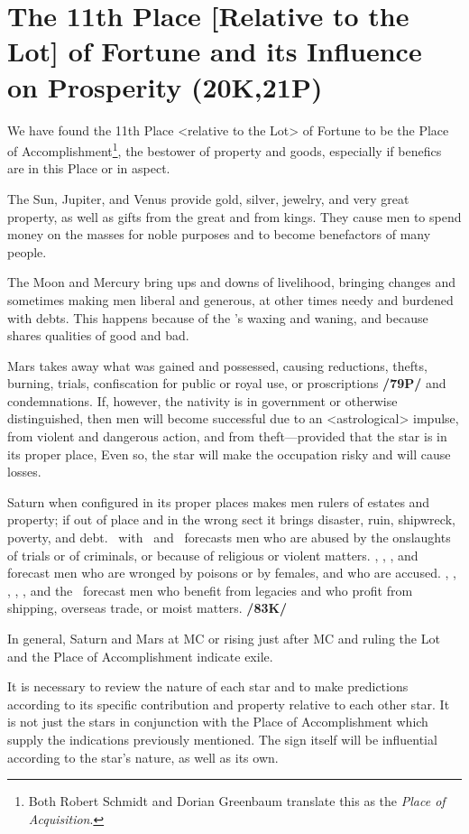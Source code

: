 \section{The 11th Place [Relative to the Lot] of Fortune and its Influence on Prosperity (20K,21P)}
We have found the 11th Place <relative to the Lot> of Fortune to be the Place of Accomplishment\footnote{Both Robert Schmidt and Dorian Greenbaum translate this as the \textsl{Place of Acquisition}.}, the bestower of property and goods, especially if benefics are in this Place or in aspect. 

  
The Sun, Jupiter, and Venus provide gold, silver, jewelry, and very great property, as well as gifts from the great and from kings. They cause men to spend money on the masses for noble purposes and to become benefactors of many
people. 

 
The Moon and Mercury bring ups and downs of livelihood, bringing changes and sometimes making men liberal and generous, at other times needy and burdened with debts. This happens because of the \Moon’s waxing and waning, and because \Mercury\, shares qualities of good and bad. 

Mars takes away what was gained and possessed, causing reductions, thefts, burning, trials, confiscation for public or royal use, or proscriptions \textbf{/79P/} and condemnations. If, however, the nativity is in government or otherwise distinguished, then men will become successful due to an <astrological> impulse, from violent and dangerous action, and from theft—provided that the star is in its proper place, Even so, the star will make the occupation risky and will cause losses. 

Saturn when configured in its proper places makes men rulers of estates and property; if out of place and in the wrong sect it brings disaster, ruin, shipwreck, poverty, and
debt. \Saturn\, with \Mercury\, and \Mars\, forecasts men who are abused by the onslaughts of trials or of criminals, or because of religious or violent matters. \Saturn, \Mercury, \Mars, and \Venus forecast men who are wronged by poisons or by females, and who are accused. \Saturn, \Mars, \Mercury, \Venus, \Jupiter, and the \Moon\, forecast men who benefit from legacies and who profit from shipping, overseas trade, or moist matters. \textbf{/83K/}

 
In general, Saturn and Mars at MC or rising just after MC and ruling the Lot and the Place of Accomplishment indicate exile.

\mndl [0.2cm]
It is necessary to review the nature of each star and to make predictions according to its specific contribution and property relative to each other star. It is not just the stars in conjunction with the Place of Accomplishment which supply the indications previously mentioned. The sign itself will be influential according to the star’s nature, as well as its own.

\newpage